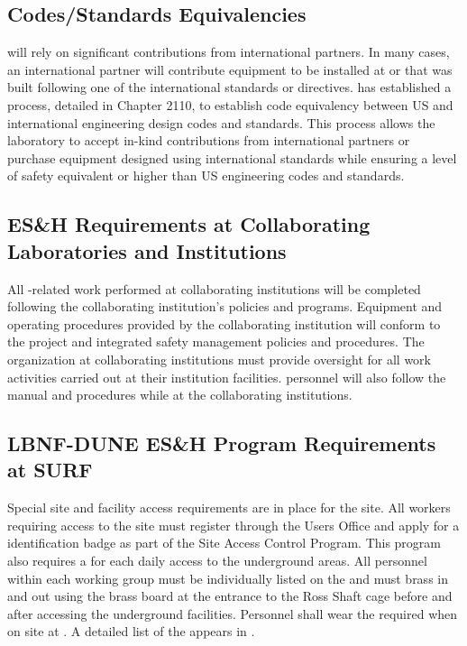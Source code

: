\subsection{Codes/Standards Equivalencies}
\label{sec:es-tc-esh_codes}

 will rely on significant contributions from international
partners. In many cases, an international partner will contribute
equipment to be installed at  or  
that was built following one of the
international standards or directives.  has established a
process, detailed in  Chapter 2110, to establish code
equivalency between US and international engineering design codes
and standards. This process allows the laboratory to accept in-kind
contributions from international partners or purchase equipment
designed using international standards while ensuring a level of safety equivalent or
higher than US engineering codes and standards.


\subsection{ES\&H Requirements at Collaborating Laboratories and Institutions}

All -related work performed at collaborating institutions will be completed
following the collaborating institution's  policies and
programs. Equipment and operating procedures provided by the
collaborating institution will conform to the  project
 and integrated safety management policies and
procedures. The  organization at collaborating institutions
must provide  oversight for all work activities carried
out at their institution facilities. 
personnel will also follow the  manual and procedures while at
the collaborating institutions.

\subsection{LBNF-DUNE ES\&H Program Requirements at SURF}

Special site and facility access requirements are in place for the  site. All  workers requiring access to the  site must
register through the \fnal Users Office and apply for
a  identification badge as part of
the  Site Access Control Program.
This program also requires a  for each daily access to the
underground areas.  All personnel within each working group must be
individually listed on the  and must brass in and
out using the brass board at the entrance to the Ross Shaft
cage before and after accessing the underground facilities. Personnel shall wear the required  when on site at . 
A detailed list of the  appears in \tcchesh. 


